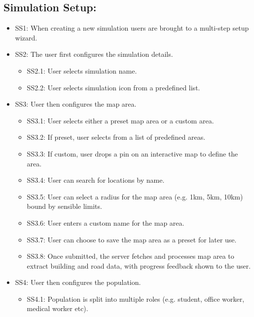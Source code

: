 \subsection{Simulation Setup:}
\begin{itemize}
    \item\label{req:SS1} SS1: When creating a new simulation users are brought to a multi-step setup wizard.
    \item\label{req:SS2} SS2: The user first configures the simulation details.
    \begin{itemize}
        \item\label{req:SS2.1} SS2.1: User selects simulation name.
        \item\label{req:SS2.2} SS2.2: User selects simulation icon from a predefined list.
    \end{itemize}
    \item\label{req:SS3} SS3: User then configures the map area.
    \begin{itemize}
        \item\label{req:SS3.1} SS3.1: User selects either a preset map area or a custom area.
        \item\label{req:SS3.2} SS3.2: If preset, user selects from a list of predefined areas.
        \item\label{req:SS3.3} SS3.3: If custom, user drops a pin on an interactive map to define the area.
        \item\label{req:SS3.4} SS3.4: User can search for locations by name.
        \item\label{req:SS3.5} SS3.5: User can select a radius for the map area (e.g. 1km, 5km, 10km) bound by sensible limits.
        \item\label{req:SS3.6} SS3.6: User enters a custom name for the map area.
        \item\label{req:SS3.7} SS3.7: User can choose to save the map area as a preset for later use.
        \item\label{req:SS3.8} SS3.8: Once submitted, the server fetches and processes map area to extract building and road data, with progress feedback shown to the user.
    \end{itemize}
    \item\label{req:SS4} SS4: User then configures the population.
    \begin{itemize}
        \item\label{req:SS4.1} SS4.1: Population is split into multiple roles (e.g. student, office worker, medical worker etc).

\end{itemize}
\end{itemize}
